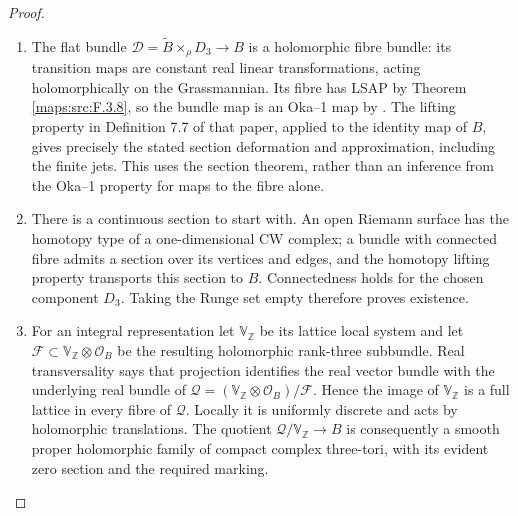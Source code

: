 \documentclass[11pt,a4paper]{article}
\theoremstyle{definition}
\begin{document}
\begin{proof}
\begin{enumerate}[label=\arabic*.]
\item The flat bundle
$\mathscr D=\widetilde B\times_\rho D_3\to B$ is a holomorphic
fibre bundle: its transition maps are constant real linear
transformations, acting holomorphically on the Grassmannian.
Its fibre has LSAP by Theorem \ref{maps:src:F.3.8}, so the bundle map is an
Oka--1 map by \cite[Proposition 7.13(d), p.~24]{IVVOkaOneV5}.
The lifting property in Definition 7.7 of that paper, applied
to the identity map of $B$, gives precisely the stated section
deformation and approximation, including the finite jets.
This uses the section theorem, rather than an inference from
the Oka--1 property for maps to the fibre alone.

\item There is a continuous section to start with.  An open Riemann
surface has the homotopy type of a one-dimensional CW complex;
a bundle with connected fibre admits a section over its vertices
and edges, and the homotopy lifting property transports this
section to $B$.  Connectedness holds for the chosen component
$D_3$.  Taking the Runge set empty therefore proves existence.

\item For an integral representation let $\mathbb V_\mathbb Z$ be its
lattice local system and let $\mathcal F\subset
\mathbb V_\mathbb Z\otimes\mathcal O_B$ be the resulting
holomorphic rank-three subbundle.  Real transversality says that
projection identifies the real vector bundle with the underlying
real bundle of
$\mathcal Q=(\mathbb V_\mathbb Z\otimes\mathcal O_B)/\mathcal F$.
Hence the image of $\mathbb V_\mathbb Z$ is a full lattice in
every fibre of $\mathcal Q$.  Locally it is uniformly discrete
and acts by holomorphic translations.  The quotient
$\mathcal Q/\mathbb V_\mathbb Z\to B$ is consequently a smooth
proper holomorphic family of compact complex three-tori,
with its evident zero section and the required marking.

\end{enumerate}
\end{proof}
\end{document}
